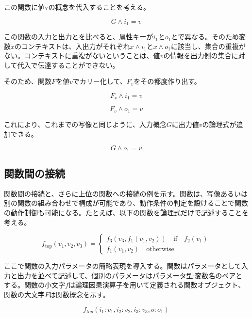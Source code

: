 \documentclass[12pt]{article}
\begin{document}
この関数に値vの概念を代入することを考える。

\begin{equation} G \wedge i_1 = v\end{equation}

この関数の入力と出力とを比べると、属性キーが\(i_1\)と\(o_1\)とで異なる。そのため変数\(x\)のコンテキストは、入出力がそれぞれ\(x\wedge i_1\)と\(x \wedge o_1\)に該当し、集合の重複がない。コンテキストに重複がないということは、値\(v\)の情報を出力側の集合に対して代入で伝達することができない。

そのため、関数\(F\)を値\(v\)でカリー化して、\(F_v\)をその都度作り出す。

\begin{equation} F_v \wedge i_1 = v\end{equation}

\begin{equation} F_v \wedge o_1 = v\end{equation}

これにより、これまでの写像と同じように、入力概念\(G\)に出力値\(v\)の論理式が追加できる。

\begin{equation}G \wedge o_1 = v \end{equation}

\subsection{関数間の接続}\label{ux95a2ux6570ux9593ux306eux63a5ux7d9a}

関数間の接続と、さらに上位の関数への接続の例を示す。関数は、写像あるいは別の関数の組み合わせで構成が可能であり、動作条件の判定を設けることで関数の動作制御も可能になる。たとえば、以下の関数を論理式だけで記述することを考える。

\begin{equation}
f_{\text{top}}(v_1,v_2,v_3) =
\begin{cases}
 f_3(v_3, f_1(v_1, v_2))
\quad \text{if} \quad f_2(v_1)\\
 f_1(v_1, v_2) \quad\text{otherwise}
\end{cases}
\end{equation}

ここで関数の入力パラメータの簡略表現を導入する。関数はパラメータとして入力と出力を並べて記述して、個別のパラメータはパラメータ型:変数名のペアとする。関数の小文字\(f\)は論理因果演算子を用いて定義される関数オブジェクト、関数の大文字\(F\)は関数概念を示す。

\begin{equation} f_{top}(i_1:v_1,i_2:v_2,i_3:v_3,o:o_1)\end{equation}
\end{document}
